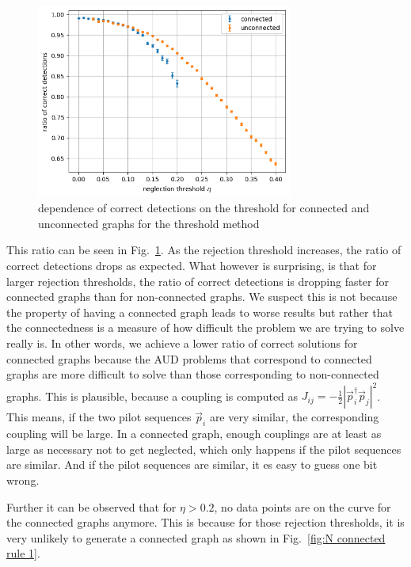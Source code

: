 \documentclass{article}
\begin{document}
	\begin{figure}[h]
		\centering
		\includegraphics[width=0.75\textwidth]{img/connected_unconnected_rule_1.png}
		\caption{dependence of correct detections on the threshold for connected and unconnected graphs for the threshold method}
		\label{fig:connected unconnected rule 1}
	\end{figure}
	This ratio can be seen in Fig.~\ref{fig:connected unconnected rule 1}. As the rejection threshold increases, the ratio of correct detections drops as expected. What however is surprising, is that for larger rejection thresholds, the ratio of correct detections is dropping faster for connected graphs than for non-connected graphs. We suspect this is not because the property of having a connected graph leads to worse results but rather that the connectedness is a measure of how difficult the problem we are trying to solve really is. In other words, we achieve a lower ratio of correct solutions for connected graphs because the AUD problems that correspond to connected graphs are more difficult to solve than those corresponding to non-connected graphs. This is plausible, because a coupling is computed as $J_{ij} = -\frac{1}{2}|\vec p_i^\dagger \vec p_j|^2$. This means, if the two pilot sequences $\vec p_i$ are very similar, the corresponding coupling will be large. In a connected graph, enough couplings are at least as large as necessary not to get neglected, which only happens if the pilot sequences are similar. And if the pilot sequences are similar, it es easy to guess one bit wrong. 
	
	Further it can be observed that for $\eta>0.2$, no data points are on the curve for the connected graphs anymore. This is because for those rejection thresholds, it is very unlikely to generate a connected graph as shown in Fig.~\ref{fig:N connected rule 1}.
	
\end{document}
